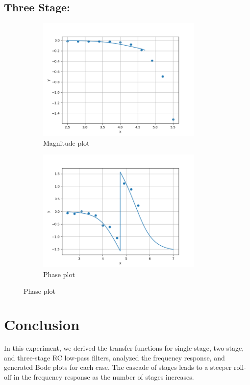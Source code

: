 \documentclass[a4paper,12pt]{article}
\begin{document}
\subsection*{Three Stage:}
\begin{figure}[h!]
	\begin{subfigure}[b]{100pt}
		\caption{Magnitude plot}
		\includegraphics[width = 230pt]{figs/fig5.png}
	\end{subfigure}
	\hspace{110pt}
	\begin{subfigure}[b]{100pt}
		\caption{Phase plot}
		\includegraphics[width = 230pt]{figs/fig6.png}
	\end{subfigure}
\end{figure}

\section{Conclusion}
In this experiment, we derived the transfer functions for single-stage, two-stage, and three-stage RC low-pass filters, analyzed the frequency response, and generated Bode plots for each case. The cascade of stages leads to a steeper roll-off in the frequency response as the number of stages increases.
\end{document}
